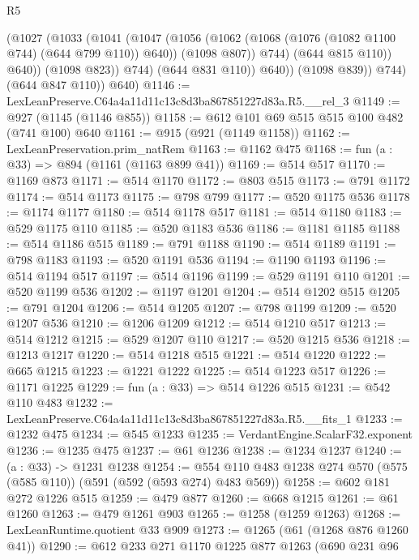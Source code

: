 \begin{lexlean}{R5}
\begin{coremodule}
                      (@1027
                        (@1033
                          (@1041
                            (@1047
                              (@1056
                                (@1062 (@1068 (@1076 (@1082 @1100 @744) (@644 @799 @110)) @640))
                                (@1098 @807))
                              @744)
                            (@644 @815 @110))
                          @640))
                      (@1098 @823))
                    @744)
                  (@644 @831 @110))
                @640))
            (@1098 @839))
          @744)
        (@644 @847 @110))
      @640)
@1146 := LexLeanPreserve.C64a4a11d11c13c8d3ba867851227d83a.R5.__rel_3
@1149 := @927 (@1145 (@1146 @855))
@1158 := @612 @101 @69 @515 @515 @100 @482 (@741 @100) @640
@1161 := @915 (@921 (@1149 @1158))
@1162 := LexLeanPreservation.prim_natRem
@1163 := @1162 @475
@1168 := fun (a : @33) => @894 (@1161 (@1163 @899 @41))
@1169 := @514 @517
@1170 := @1169 @873
@1171 := @514 @1170
@1172 := @803 @515
@1173 := @791 @1172
@1174 := @514 @1173
@1175 := @798 @799
@1177 := @520 @1175 @536
@1178 := @1174 @1177
@1180 := @514 @1178 @517
@1181 := @514 @1180
@1183 := @529 @1175 @110
@1185 := @520 @1183 @536
@1186 := @1181 @1185
@1188 := @514 @1186 @515
@1189 := @791 @1188
@1190 := @514 @1189
@1191 := @798 @1183
@1193 := @520 @1191 @536
@1194 := @1190 @1193
@1196 := @514 @1194 @517
@1197 := @514 @1196
@1199 := @529 @1191 @110
@1201 := @520 @1199 @536
@1202 := @1197 @1201
@1204 := @514 @1202 @515
@1205 := @791 @1204
@1206 := @514 @1205
@1207 := @798 @1199
@1209 := @520 @1207 @536
@1210 := @1206 @1209
@1212 := @514 @1210 @517
@1213 := @514 @1212
@1215 := @529 @1207 @110
@1217 := @520 @1215 @536
@1218 := @1213 @1217
@1220 := @514 @1218 @515
@1221 := @514 @1220
@1222 := @665 @1215
@1223 := @1221 @1222
@1225 := @514 @1223 @517
@1226 := @1171 @1225
@1229 := fun (a : @33) => @514 @1226 @515
@1231 := @542 @110 @483
@1232 := LexLeanPreserve.C64a4a11d11c13c8d3ba867851227d83a.R5.__fits_1
@1233 := @1232 @475
@1234 := @545 @1233
@1235 := VerdantEngine.ScalarF32.exponent
@1236 := @1235 @475
@1237 := @61 @1236
@1238 := @1234 @1237
@1240 := (a : @33) -> @1231 @1238
@1254 := @554 @110 @483 @1238 @274 @570 (@575 (@585 @110)) (@591 (@592 (@593 @274) @483 @569))
@1258 := @602 @181 @272 @1226 @515
@1259 := @479 @877
@1260 := @668 @1215
@1261 := @61 @1260
@1263 := @479 @1261 @903
@1265 := @1258 (@1259 @1263)
@1268 := LexLeanRuntime.quotient @33 @909
@1273 := @1265 (@61 (@1268 @876 @1260 @41))
@1290 := @612
    @233
    @271
    @1170
    @1225
    @877
    @1263
    (@690
      @231
      @96

\end{coremodule}
\end{lexlean}

